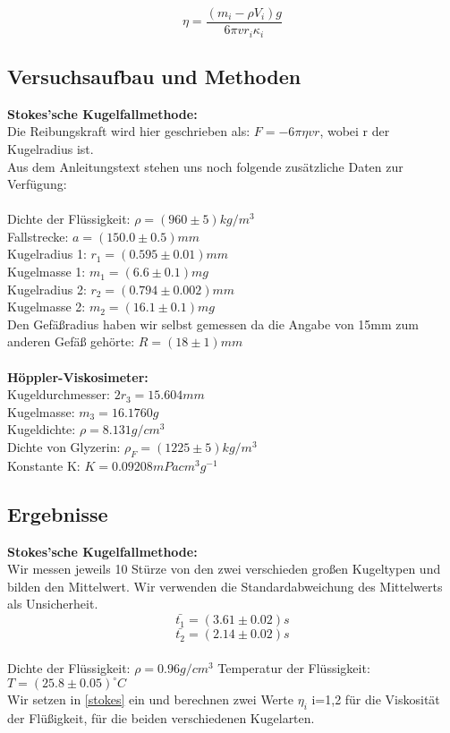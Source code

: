 \documentclass{article}
\begin{document}
\begin{equation}
\label{stokes}
\eta=\frac{(m_i-\rho V_i)g}{6\pi v r_i \kappa_i}
\end{equation}
\subsection{Versuchsaufbau und Methoden}

\textbf{Stokes'sche Kugelfallmethode:}\\
Die Reibungskraft wird hier geschrieben als:
$F = -6 \pi \eta v r$, wobei r der Kugelradius ist. \\
Aus dem Anleitungstext stehen uns noch folgende zusätzliche Daten zur Verfügung:\\
\\
Dichte der Flüssigkeit: $\rho=(960 \pm 5) kg/m^3$\\
Fallstrecke: $a=(150.0 \pm 0.5)mm$\\
Kugelradius 1: $r_1=(0.595 \pm 0.01)mm$\\
Kugelmasse 1: $m_1=(6.6 \pm 0.1)mg$\\
Kugelradius 2: $r_2=(0.794 \pm 0.002)mm$\\
Kugelmasse 2: $m_2=(16.1 \pm 0.1)mg$\\
Den Gefäßradius haben wir selbst gemessen da die Angabe von 15mm zum anderen Gefäß gehörte: $R=(18 \pm 1)mm$\\ 
\\
\textbf{Höppler-Viskosimeter:}\\
Kugeldurchmesser: $2r_3=15.604mm$\\
Kugelmasse: $m_3=16.1760g$\\
Kugeldichte: $\rho=8.131 g/cm^3$\\
Dichte von Glyzerin: $\rho_F=(1225 \pm 5)kg/m^3$\\
Konstante K: $K=0.09208mPa cm^3 g^{-1}$\\

\subsection{Ergebnisse}
\textbf{Stokes'sche Kugelfallmethode:}\\
Wir messen jeweils 10 Stürze von den zwei verschieden großen Kugeltypen und bilden den Mittelwert. Wir verwenden die Standardabweichung des Mittelwerts als Unsicherheit.
$$\bar{t_1}=(3.61\pm0.02)s$$
$$\bar{t_2}=(2.14\pm0.02)s$$
\\
Dichte der Flüssigkeit: $\rho=0.96 g/cm^3$
Temperatur der Flüssigkeit: $T=(25.8 \pm 0.05)^\circ C$
\\
Wir setzen in \ref{stokes} ein und berechnen zwei Werte $\eta_i$ i=1,2 für die Viskosität der Flüßigkeit, für die beiden verschiedenen Kugelarten. \\
\end{document}
